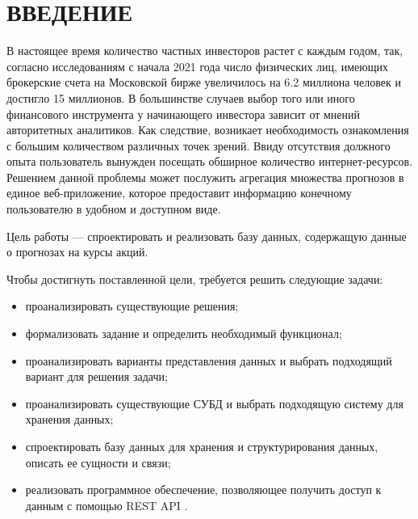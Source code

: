 \chapter*{ВВЕДЕНИЕ}

В настоящее время количество частных инвесторов растет с каждым годом, так, согласно исследованиям с начала 2021 года число физических лиц, имеющих брокерские счета на Московской бирже увеличилось на 6.2 миллиона человек и достигло 15 миллионов. В большинстве случаев выбор того или иного финансового инструмента у начинающего инвестора зависит от мнений авторитетных аналитиков. Как следствие, возникает необходимость ознакомления с большим количеством различных точек зрений. Ввиду отсутствия должного опыта пользователь вынужден посещать обширное количество интернет-ресурсов. Решением данной проблемы может послужить агрегация множества прогнозов в единое веб-приложение, которое предоставит информацию конечному пользователю в удобном и доступном виде.

Цель работы --- спроектировать и реализовать базу данных, содержащую данные о прогнозах на курсы акций.

Чтобы достигнуть поставленной цели, требуется решить следующие задачи:

\begin{itemize}
    \item проанализировать существующие решения;
    \item формализовать задание и определить необходимый функционал;
    \item проанализировать варианты представления данных и выбрать подходящий вариант для решения задачи;
    \item проанализировать существующие СУБД и выбрать подходящую систему для хранения данных;
    \item спроектировать базу данных для хранения и структурирования данных, описать ее сущности и связи;
    \item реализовать программное обеспечение, позволяющее получить доступ к данным с помощью REST API \cite{6}.
\end{itemize}
